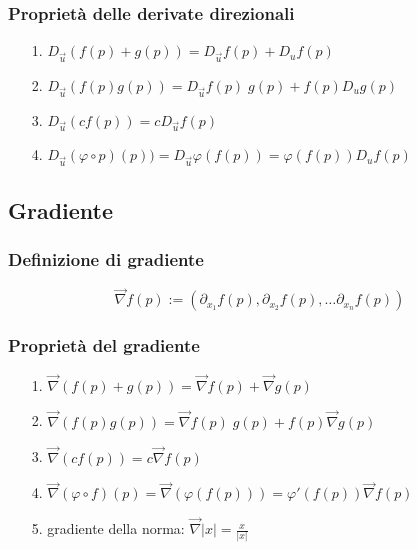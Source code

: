 \documentclass[a4paper]{article}
\newcommand\nab{\vec{\nabla}} %
\begin{document}
\subsubsection*{Proprietà delle derivate direzionali}
\begin{itemize}[topsep=3pt, itemsep=0pt]
	\item[1.] \(D_{\vec{u}} (f(p) + g(p)) = D_{\vec{u}} f(p) + D_u f(p)\)
	\item[2.] \(D_{\vec{u}} (f(p)g(p)) = D_{\vec{u}} f(p) \; g(p) + f(p) D_u g(p)\)
	\item[3.] \(D_{\vec{u}} (c f(p)) = c D_{\vec{u}} f(p)\)
	\item[4.] \(D_{\vec{u}} (\varphi \circ p)(p)) = D_{\vec{u}} \varphi(f(p)) = \varphi(f(p)) D_u f(p)\)
\end{itemize}

\subsection{Gradiente}
\subsubsection*{Definizione di gradiente}
\[\nab f(p) := \left( \partial_{x_1} f(p), \partial_{x_2} f(p), \dots \partial_{x_n} f(p)\right)\]

\subsubsection*{Proprietà del gradiente} %
\begin{itemize}[topsep=3pt, itemsep=0pt]
	\item[1.] \(\nab (f(p) + g(p)) = \nab f(p) + \nab g(p)\)
	\item[2.] \(\nab (f(p) g(p)) = \nab f(p) \; g(p) + f(p) \nab g(p)\)
	\item[3.] \(\nab (c f(p)) = c \nab f(p)\)
	\item[4.] \(\nab (\varphi \circ f)(p) = \nab (\varphi(f(p))) = \varphi'(f(p)) \nab f(p)\)
	\item[5.] gradiente della norma: \(\displaystyle \nab \left|x\right| = \frac{x}{\left|x\right|}\)
\end{itemize}
\end{document}
